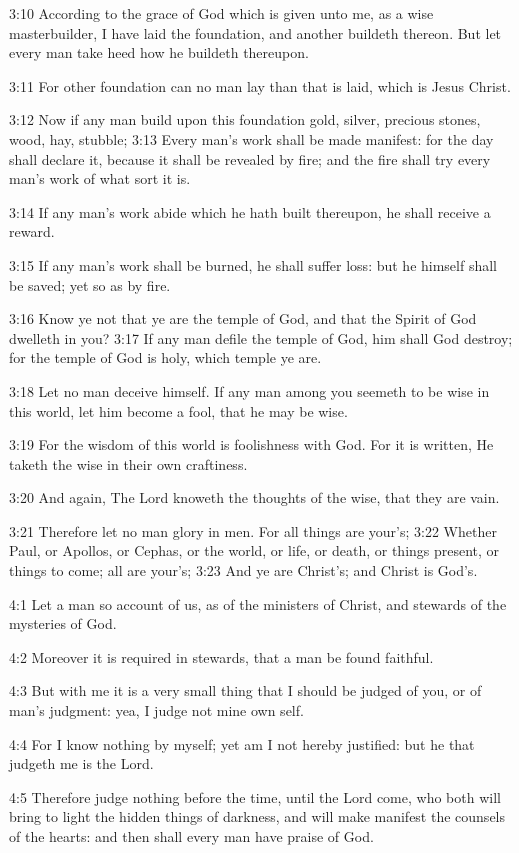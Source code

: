 3:10 According to the grace of God which is given unto me, as a wise masterbuilder, I have laid the foundation, and another buildeth thereon. But let every man take heed how he buildeth thereupon.

3:11 For other foundation can no man lay than that is laid, which is Jesus Christ.

3:12 Now if any man build upon this foundation gold, silver, precious stones, wood, hay, stubble; 3:13 Every man's work shall be made manifest: for the day shall declare it, because it shall be revealed by fire; and the fire shall try every man's work of what sort it is.

3:14 If any man's work abide which he hath built thereupon, he shall receive a reward.

3:15 If any man's work shall be burned, he shall suffer loss: but he himself shall be saved; yet so as by fire.

3:16 Know ye not that ye are the temple of God, and that the Spirit of God dwelleth in you?  3:17 If any man defile the temple of God, him shall God destroy; for the temple of God is holy, which temple ye are.

3:18 Let no man deceive himself. If any man among you seemeth to be wise in this world, let him become a fool, that he may be wise.

3:19 For the wisdom of this world is foolishness with God. For it is written, He taketh the wise in their own craftiness.

3:20 And again, The Lord knoweth the thoughts of the wise, that they are vain.

3:21 Therefore let no man glory in men. For all things are your's; 3:22 Whether Paul, or Apollos, or Cephas, or the world, or life, or death, or things present, or things to come; all are your's; 3:23 And ye are Christ's; and Christ is God's.

4:1 Let a man so account of us, as of the ministers of Christ, and stewards of the mysteries of God.

4:2 Moreover it is required in stewards, that a man be found faithful.

4:3 But with me it is a very small thing that I should be judged of you, or of man's judgment: yea, I judge not mine own self.

4:4 For I know nothing by myself; yet am I not hereby justified: but he that judgeth me is the Lord.

4:5 Therefore judge nothing before the time, until the Lord come, who both will bring to light the hidden things of darkness, and will make manifest the counsels of the hearts: and then shall every man have praise of God.

